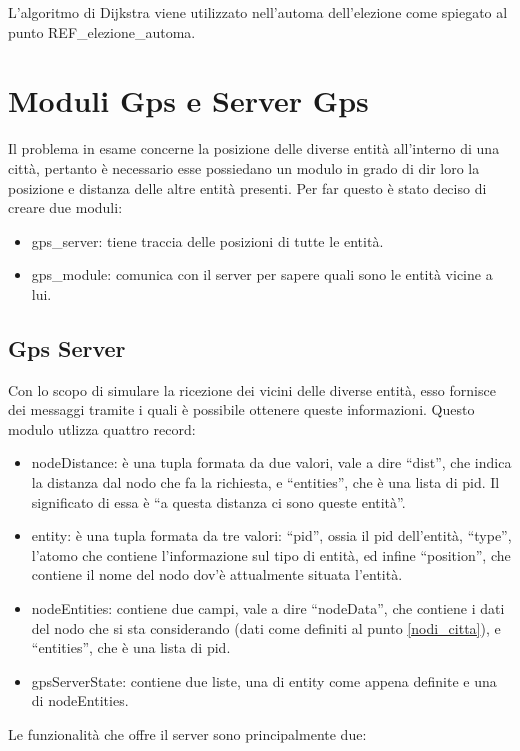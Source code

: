 L'algoritmo di Dijkstra viene utilizzato nell'automa dell'elezione come spiegato al punto REF\_elezione\_automa.

\section{Moduli Gps e Server Gps}
Il problema in esame concerne la posizione delle diverse entità all'interno di una città, pertanto è necessario esse possiedano un modulo in grado di dir loro la posizione e distanza delle altre entità presenti. Per far questo è stato deciso di creare due moduli:
\begin{itemize}
	\item gps\_server: tiene traccia delle posizioni di tutte le entità.
	\item gps\_module: comunica con il server per sapere quali sono le entità vicine a lui.
\end{itemize}

\subsection{Gps Server}\label{gps_server}
Con lo scopo di simulare la ricezione dei vicini delle diverse entità, esso fornisce dei messaggi tramite i quali è possibile ottenere queste informazioni. Questo modulo utlizza quattro record:

\begin{itemize}
	\item nodeDistance: è una tupla formata da due valori, vale a dire ``dist'', che indica la distanza dal nodo che fa la richiesta, e ``entities'', che è una lista di pid. Il significato di essa è ``a questa distanza ci sono queste entità''.
	\item entity: è una tupla formata da tre valori: ``pid'', ossia il pid dell'entità, ``type'', l'atomo che contiene l'informazione sul tipo di entità, ed infine ``position'', che contiene il nome del nodo dov'è attualmente situata l'entità.
	\item nodeEntities: contiene due campi, vale a dire ``nodeData'', che contiene i dati del nodo che si sta considerando (dati come definiti al punto \ref{nodi_citta}), e ``entities'', che è una lista di pid. 
	\item gpsServerState: contiene due liste, una di entity come appena definite e una di nodeEntities.
\end{itemize}

Le funzionalità che offre il server sono principalmente due:

